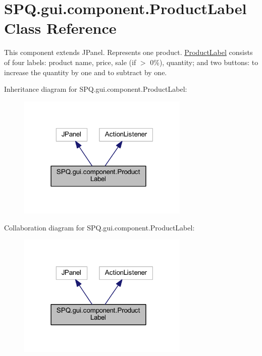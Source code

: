 \hypertarget{class_s_p_q_1_1gui_1_1component_1_1_product_label}{}\section{S\+P\+Q.\+gui.\+component.\+Product\+Label Class Reference}
\label{class_s_p_q_1_1gui_1_1component_1_1_product_label}


This component extends J\+Panel. Represents one product. \mbox{\hyperlink{class_s_p_q_1_1gui_1_1component_1_1_product_label}{Product\+Label}} consists of four labels\+: product name, price, sale (if $>$ 0\%), quantity; and two buttons\+: to increase the quantity by one and to subtract by one.  




Inheritance diagram for S\+P\+Q.\+gui.\+component.\+Product\+Label\+:
\nopagebreak
\begin{figure}[H]
\begin{center}
\leavevmode
\includegraphics[width=231pt]{class_s_p_q_1_1gui_1_1component_1_1_product_label__inherit__graph}
\end{center}
\end{figure}


Collaboration diagram for S\+P\+Q.\+gui.\+component.\+Product\+Label\+:
\nopagebreak
\begin{figure}[H]
\begin{center}
\leavevmode
\includegraphics[width=231pt]{class_s_p_q_1_1gui_1_1component_1_1_product_label__coll__graph}
\end{center}
\end{figure}
